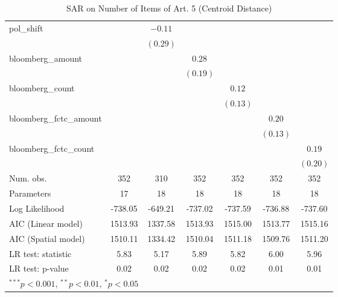 \begin{table}[!h]
\begin{center}
\begin{tabular}{l c c c c c c }
pol\_shift              &              & $-0.11$     &              &              &              &              \\
                        &              & $(0.29)$    &              &              &              &              \\
bloomberg\_amount       &              &             & $0.28$       &              &              &              \\
                        &              &             & $(0.19)$     &              &              &              \\
bloomberg\_count        &              &             &              & $0.12$       &              &              \\
                        &              &             &              & $(0.13)$     &              &              \\
bloomberg\_fctc\_amount &              &             &              &              & $0.20$       &              \\
                        &              &             &              &              & $(0.13)$     &              \\
bloomberg\_fctc\_count  &              &             &              &              &              & $0.19$       \\
                        &              &             &              &              &              & $(0.20)$     \\
\midrule
Num. obs.               & 352          & 310         & 352          & 352          & 352          & 352          \\
Parameters              & 17           & 18          & 18           & 18           & 18           & 18           \\
Log Likelihood          & -738.05      & -649.21     & -737.02      & -737.59      & -736.88      & -737.60      \\
AIC (Linear model)      & 1513.93      & 1337.58     & 1513.93      & 1515.00      & 1513.77      & 1515.16      \\
AIC (Spatial model)     & 1510.11      & 1334.42     & 1510.04      & 1511.18      & 1509.76      & 1511.20      \\
LR test: statistic      & 5.83         & 5.17        & 5.89         & 5.82         & 6.00         & 5.96         \\
LR test: p-value        & 0.02         & 0.02        & 0.02         & 0.02         & 0.01         & 0.01         \\
\bottomrule
\multicolumn{7}{l}{\scriptsize{$^{***}p<0.001$, $^{**}p<0.01$, $^*p<0.05$}}
\end{tabular}
\caption{SAR on Number of Items of Art. 5 (Centroid Distance)}
\label{table:coefficients}
\end{center}
\end{table}
